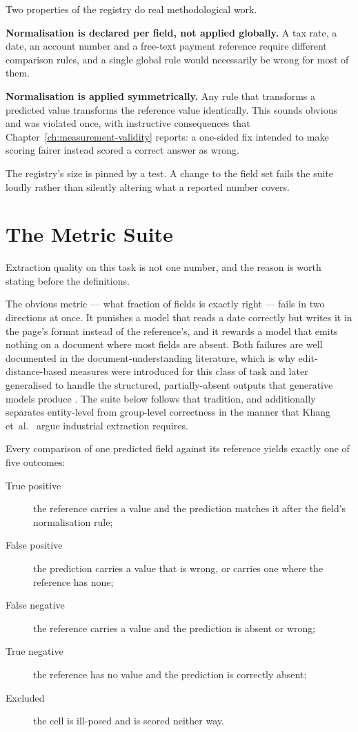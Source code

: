 Two properties of the registry do real methodological work.

\textbf{Normalisation is declared per field, not applied globally.} A tax rate, a date, an
account number and a free-text payment reference require different comparison rules, and a
single global rule would necessarily be wrong for most of them.

\textbf{Normalisation is applied symmetrically.} Any rule that transforms a predicted value
transforms the reference value identically. This sounds obvious and was violated once, with
instructive consequences that Chapter~\ref{ch:measurement-validity} reports: a one-sided
fix intended to make scoring fairer instead scored a correct answer as wrong.

The registry's size is pinned by a test. A change to the field set fails the suite loudly
rather than silently altering what a reported number covers.

\section{The Metric Suite}
\label{sec:method-metrics}

Extraction quality on this task is not one number, and the reason is worth stating before the
definitions.

The obvious metric --- what fraction of fields is exactly right --- fails in two directions at
once. It punishes a model that reads a date correctly but writes it in the page's format
instead of the reference's, and it rewards a model that emits nothing on a document where
most fields are absent. Both failures are well documented in the document-understanding
literature, which is why edit-distance-based measures were introduced for this class of task
\parencite{biten2019anls} and later generalised to handle the structured, partially-absent outputs
that generative models produce \parencite{peer2024anlsstar}. The suite below follows that
tradition, and additionally separates entity-level from group-level correctness in the manner
that Khang et~al.\ \parencite{kieval2025} argue industrial extraction requires.

Every comparison of one predicted field against its reference yields exactly one of five
outcomes:

\begin{description}
  \item[True positive] the reference carries a value and the prediction matches it after
        the field's normalisation rule;
  \item[False positive] the prediction carries a value that is wrong, or carries one where
        the reference has none;
  \item[False negative] the reference carries a value and the prediction is absent or wrong;
  \item[True negative] the reference has no value and the prediction is correctly absent;
  \item[Excluded] the cell is ill-posed and is scored neither way.
\end{description}

